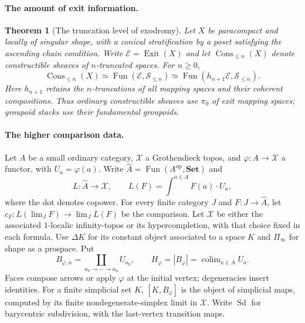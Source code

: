 \documentclass[11pt,a4paper]{article}
\newtheorem{theorem}{Theorem}[section]
\theoremstyle{definition}
\begin{document}
\paragraph{The amount of exit information.}
\begin{theorem}[The truncation level of exodromy]\label{thm:truncation}
Let $X$ be paracompact and locally of singular shape, with a conical
stratification by a poset satisfying the ascending chain condition.
Write $\mathcal E=\operatorname{Exit}(X)$ and let $\operatorname{Cons}_{\le n}(X)$ denote constructible sheaves of $n$-truncated spaces. For $n\geq0$,
\[
 \operatorname{Cons}_{\leq n}(X)
 \simeq\operatorname{Fun}(\mathcal E,\mathcal S_{\leq n})
 \simeq\operatorname{Fun}(h_{n+1}\mathcal E,\mathcal S_{\leq n}).
\]
Here $h_{n+1}$ retains the $n$-truncations of all mapping spaces and
their coherent compositions. Thus ordinary constructible sheaves use
$\pi_0$ of exit mapping spaces; groupoid stacks use their fundamental
groupoids.
\end{theorem}


\paragraph{The higher comparison data.}
Let $A$ be a small ordinary category, $\mathcal X$ a Grothendieck
topos, and $\varphi:A\to\mathcal X$ a functor, with $U_a=\varphi(a)$.
Write $\widehat A=\operatorname{Fun}(A^{\mathrm{op}},\mathbf{Set})$ and
\[
 L:\widehat A\longrightarrow\mathcal X,\qquad
 L(F)=\int^{a\in A}F(a)\cdot U_a ,
\]
where the dot denotes copower. For every finite category $J$ and
$F:J\to\widehat A$, let $c_F:L(\lim_JF)\to\lim_JL(F)$ be the comparison.
Let $\mathscr X$ be either the associated $1$-localic infinity-topos or
its hypercompletion, with that choice fixed in each formula.
Use $\Delta K$ for its constant object associated to a space $K$ and
$\Pi_\infty$ for shape as a prospace. Put
\[
 B_{\varphi,n}=\coprod_{a_0\to\cdots\to a_n}U_{a_0},
 \qquad H_\varphi=|B_\varphi|=\operatorname{colim}_{a\in A}U_a .
\]
Faces compose arrows or apply $\varphi$ at the initial vertex;
degeneracies insert identities. For a finite simplicial set $K$,
$[K,B_\varphi]$ is the object of simplicial maps, computed by its finite
nondegenerate-simplex limit in $\mathcal X$. Write $\operatorname{Sd}$
for barycentric subdivision, with the last-vertex transition maps.
\end{document}
